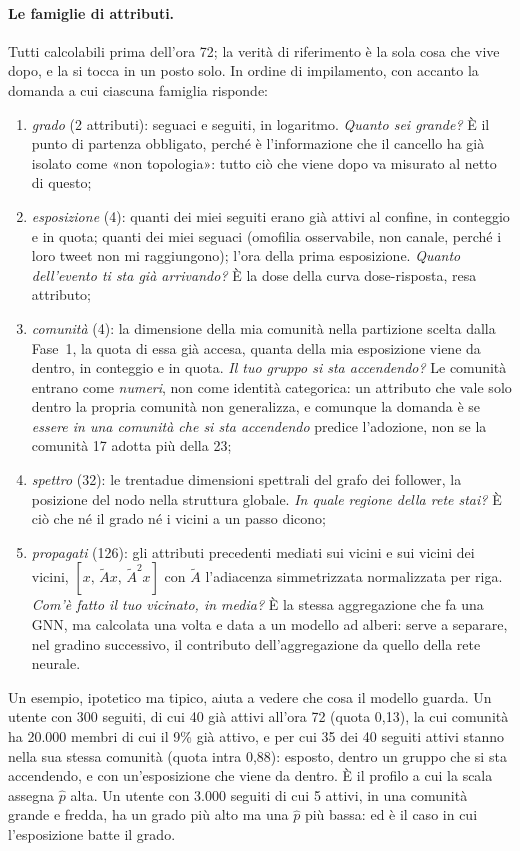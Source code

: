 \documentclass[11pt,a4paper]{article}
\newcommand{\phat}{\hat{p}}
\begin{document}
\paragraph{Le famiglie di attributi.} Tutti calcolabili prima dell'ora 72; la verità di riferimento è la sola cosa che vive dopo, e la si tocca in un posto solo. In ordine di impilamento, con accanto la domanda a cui ciascuna famiglia risponde:
\begin{enumerate}
  \item \emph{grado} (2 attributi): seguaci e seguiti, in logaritmo. \emph{Quanto sei grande?} È il punto di partenza obbligato, perché è l'informazione che il cancello ha già isolato come «non topologia»: tutto ciò che viene dopo va misurato al netto di questo;
  \item \emph{esposizione} (4): quanti dei miei seguiti erano già attivi al confine, in conteggio e in quota; quanti dei miei seguaci (omofilia osservabile, non canale, perché i loro tweet non mi raggiungono); l'ora della prima esposizione. \emph{Quanto dell'evento ti sta già arrivando?} È la dose della curva dose-risposta, resa attributo;
  \item \emph{comunità} (4): la dimensione della mia comunità nella partizione scelta dalla Fase~1, la quota di essa già accesa, quanta della mia esposizione viene da dentro, in conteggio e in quota. \emph{Il tuo gruppo si sta accendendo?} Le comunità entrano come \emph{numeri}, non come identità categorica: un attributo che vale solo dentro la propria comunità non generalizza, e comunque la domanda è se \emph{essere in una comunità che si sta accendendo} predice l'adozione, non se la comunità 17 adotta più della 23;
  \item \emph{spettro} (32): le trentadue dimensioni spettrali del grafo dei follower, la posizione del nodo nella struttura globale. \emph{In quale regione della rete stai?} È ciò che né il grado né i vicini a un passo dicono;
  \item \emph{propagati} (126): gli attributi precedenti mediati sui vicini e sui vicini dei vicini, $[x,\, \tilde{A}x,\, \tilde{A}^2 x]$ con $\tilde{A}$ l'adiacenza simmetrizzata normalizzata per riga. \emph{Com'è fatto il tuo vicinato, in media?} È la stessa aggregazione che fa una GNN, ma calcolata una volta e data a un modello ad alberi: serve a separare, nel gradino successivo, il contributo dell'aggregazione da quello della rete neurale.
\end{enumerate}
Un esempio, ipotetico ma tipico, aiuta a vedere che cosa il modello guarda. Un utente con 300 seguiti, di cui 40 già attivi all'ora 72 (quota 0,13), la cui comunità ha 20.000 membri di cui il 9\% già attivo, e per cui 35 dei 40 seguiti attivi stanno nella sua stessa comunità (quota intra 0,88): esposto, dentro un gruppo che si sta accendendo, e con un'esposizione che viene da dentro. È il profilo a cui la scala assegna $\phat$ alta. Un utente con 3.000 seguiti di cui 5 attivi, in una comunità grande e fredda, ha un grado più alto ma una $\phat$ più bassa: ed è il caso in cui l'esposizione batte il grado.
\end{document}
